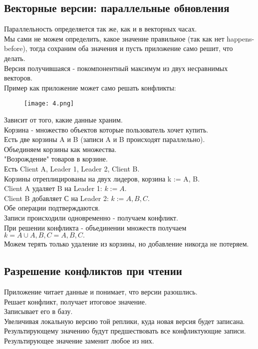 \subsection{Векторные версии: параллельные обновления}
Параллельность определяется так же, как и в векторных часах. \\
Мы сами не можем определить, какое значение правильное (так как нет happens-before), тогда сохраним оба значения и пусть приложение само решит, что делать. \\
Версия получившаяся - покомпонентный максимум из двух несравнимых векторов. \\
Пример как приложение может само решать конфликты:\\
\begin{figure}[h]
    \centering
    \texttt{[image: 4.png]}
    \caption{}
\end{figure}
Зависит от того, какие данные храним.\\
Корзина - множество объектов которые пользователь хочет купить.\\
Есть две корзины A и B (записи A и B происходят параллельно).\\
Объединяем корзины как множества.\\
"Возрождение" товаров в корзине.\\
Есть Client A, Leader 1, Leader 2, Client B.\\
Корзины отреплицированы на двух лидеров, корзина k := {A, B}.\\
Client A удаляет B на Leader 1: $k := {A}$.\\
Client B добавляет С на Leader 2: $k := {A, B, C}$.\\
Обе операции подтверждаются.\\
Записи происходили одновременно - получаем конфликт.\\
При решении конфликта - объединении множеств получаем $k = {A} \cup {A, B, C} = {A, B, C}.$\\
Можем терять только удаление из корзины, но добавление никогда не потеряем.\\
\subsection{Разрешение конфликтов при чтении}
Приложение читает данные и понимает, что версии разошлись.\\
Решает конфликт, получает итоговое значение.\\
Записывает его в базу.\\
Увеличивая локальную версию той реплики, куда новая версия будет записана.\\
Результирующему значению будут предшествовать все конфликтующие записи.\\
Результирующее значение заменит любое из них.\\
